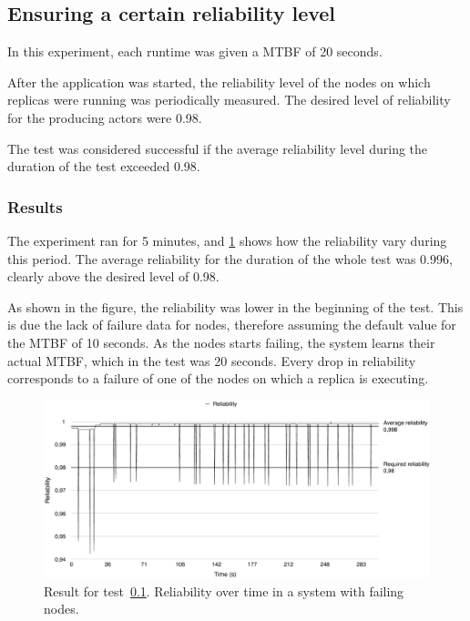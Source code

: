 \documentclass{cslthse-msc}
\begin{document}
\subsection{Ensuring a certain reliability level} \label{sec:eval_rel_level}
In this experiment, each runtime was given a MTBF of 20 seconds.

After the application was started, the reliability level of the nodes on which replicas were running was periodically measured. The desired level of reliability for the producing actors were 0.98.

The test was considered successful if the average reliability level during the duration of the test exceeded 0.98. %

\subsubsection*{Results}
The experiment ran for 5 minutes, and \cref{fig:exp_reliability_level} shows how the reliability vary during this period. The average reliability for the duration of the whole test was 0.996, clearly above the desired level of 0.98.

As shown in the figure, the reliability was lower in the beginning of the test. This is due the lack of failure data for nodes, therefore assuming the default value for the MTBF of 10 seconds. As the nodes starts failing, the system learns their actual MTBF, which in the test was 20 seconds. Every drop in reliability corresponds to a failure of one of the nodes on which a replica is executing.

\begin{figure}[!hbt]
\centering
\includegraphics[scale=0.5]{images/results/reliability.pdf}
\caption{Result for test~\ref{sec:eval_rel_level}. Reliability over time in a system with failing nodes.} \label{fig:exp_reliability_level}
\end{figure}
\end{document}

